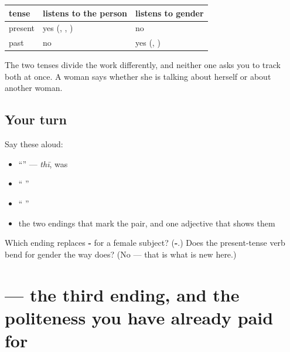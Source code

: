 \begin{grammarlens}[title={Grammar Lens: what each tense listens to}]
\noindent
\begin{tabularx}{\linewidth}{@{}>{\raggedright\arraybackslash}X>{\raggedright\arraybackslash}X>{\raggedright\arraybackslash}X@{}}
\toprule
\textbf{tense} & \textbf{listens to the person} & \textbf{listens to gender} \\
\midrule
present & yes (\hi{हूँ}, \hi{है}, \hi{हैं}) & no \\
past & no & yes (\hi{था}, \hi{थी}) \\
\bottomrule
\end{tabularx}

The two tenses divide the work differently, and neither one asks you to track both at once. A woman says  whether she is talking about herself or about another woman.
\end{grammarlens}

\subsection*{Your turn}
Say these aloud:

\begin{itemize}
\raggedright
  \item \textquotedblleft{}\textquotedblright{} — \emph{thī}, was
  \item \textquotedblleft{}   \textquotedblright{}
  \item \textquotedblleft{}   \textquotedblright{}
  \item the two endings that mark the pair, and one adjective that shows them
\end{itemize}

\begin{tcolorbox}[breakable,colback=teal!4,colframe=teal!35!black,title={Before you move on}]
Which ending replaces \textbf{-} for a female subject? (\textbf{-}.) Does the present-tense verb bend for gender the way  does? (No — that is what is new here.)
\end{tcolorbox}
\section[\texorpdfstring{\hi{थे} (the)}{थे (the)}]{ — the third ending, and the politeness you have already paid for}

\label{lesson:HI-C87-the}



